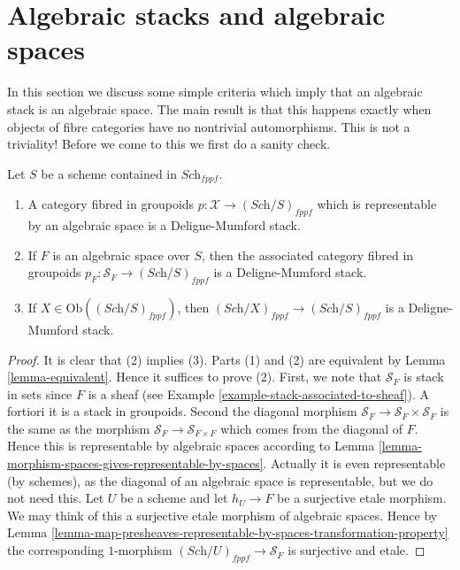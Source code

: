 \section{Algebraic stacks and algebraic spaces}
\label{section-stacks-spaces}

\noindent
In this section we discuss some simple criteria which imply that an
algebraic stack is an algebraic space. The main result is that this
happens exactly when objects of fibre categories have no nontrivial
automorphisms. This is not a triviality! Before we come to this
we first do a sanity check.

\begin{lemma}
\label{lemma-representable-algebraic}
Let $S$ be a scheme contained in $\textit{Sch}_{fppf}$.
\begin{enumerate}
\item A category fibred in groupoids
$p : \mathcal{X} \to (\textit{Sch}/S)_{fppf}$
which is representable by an algebraic space is a Deligne-Mumford stack.
\item If $F$ is an algebraic space over $S$, then the associated
category fibred in groupoids
$p_F : \mathcal{S}_F \to (\textit{Sch}/S)_{fppf}$
is a Deligne-Mumford stack.
\item If $X \in \text{Ob}((\textit{Sch}/S)_{fppf})$, then
$(\textit{Sch}/X)_{fppf} \to (\textit{Sch}/S)_{fppf}$ is
a Deligne-Mumford stack.
\end{enumerate}
\end{lemma}

\begin{proof}
It is clear that (2) implies (3).
Parts (1) and (2) are equivalent by Lemma \ref{lemma-equivalent}.
Hence it suffices to prove (2).
First, we note that $\mathcal{S}_F$ is stack in sets since
$F$ is a sheaf (see
Example \ref{example-stack-associated-to-sheaf}).
A fortiori it is a stack in groupoids. Second the diagonal
morphism $\mathcal{S}_F \to \mathcal{S}_F  \times \mathcal{S}_F$
is the same as the morphism $\mathcal{S}_F \to \mathcal{S}_{F \times F}$
which comes from the diagonal of $F$. Hence this is representable
by algebraic spaces according to
Lemma \ref{lemma-morphism-spaces-gives-representable-by-spaces}.
Actually it is even representable (by schemes), as the diagonal of
an algebraic space is representable, but we do not need this.
Let $U$ be a scheme and let $h_U \to F$ be a surjective etale morphism.
We may think of this a surjective etale morphism of algebraic spaces.
Hence by
Lemma
\ref{lemma-map-presheaves-representable-by-spaces-transformation-property}
the corresponding $1$-morphism $(\textit{Sch}/U)_{fppf} \to \mathcal{S}_F$
is surjective and etale.
\end{proof}

